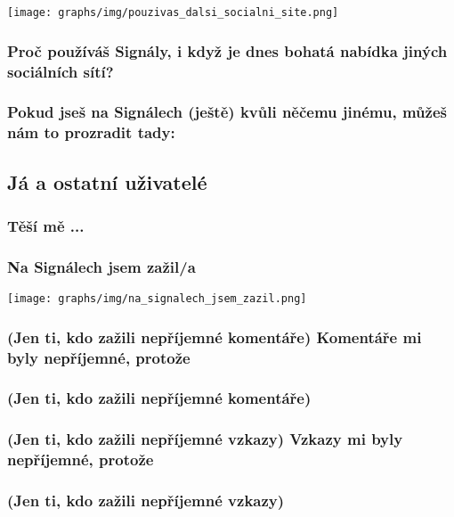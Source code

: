\documentclass[12pt, a4paper, twoside]{article}
\begin{document}
\texttt{[image: graphs/img/pouzivas\_dalsi\_socialni\_site.png]}

\subsubsection{Proč používáš Signály, i když je dnes bohatá nabídka jiných sociálních sítí?}

\subsubsection{Pokud jseš na Signálech (ještě) kvůli něčemu jinému, můžeš nám to prozradit tady:}

\subsection{Já a ostatní uživatelé}\label{sec:ostatniuzivatele}

\subsubsection{Těší mě ...}

\subsubsection{Na Signálech jsem zažil/a}

\texttt{[image: graphs/img/na\_signalech\_jsem\_zazil.png]}

\subsubsection{(Jen ti, kdo zažili nepříjemné komentáře) Komentáře mi byly nepříjemné, protože}

\subsubsection{(Jen ti, kdo zažili nepříjemné komentáře)}

\subsubsection{(Jen ti, kdo zažili nepříjemné vzkazy) Vzkazy mi byly nepříjemné, protože}

\subsubsection{(Jen ti, kdo zažili nepříjemné vzkazy)}
\end{document}
